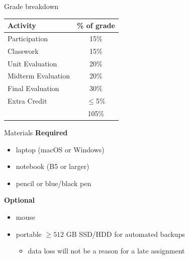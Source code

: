 \documentclass[aspectratio=169]{beamer}
\begin{document}
\begin{frame}{Grade breakdown}
    \begin{table}
    \centering
        \begin{tabular}{lc}
            \toprule
            \textbf{Activity}  & \textbf{\% of grade} \\
            \midrule
            Participation      & 15\% \\
            Classwork          & 15\% \\
            Unit Evaluation    & 20\% \\
            Midterm Evaluation & 20\% \\
            Final Evaluation   & 30\% \\
            Extra Credit       & \(\leq\)5\% \\
            \bottomrule
                               & 105\% \\
        \end{tabular}
    \end{table}   
\end{frame}


\begin{frame}{Materials}
    \textbf{Required}
    \begin{itemize}[label=--]
        \item laptop (macOS or Windows)
        \item notebook (B5 or larger)
        \item pencil or blue/black pen
    \end{itemize}
    \vspace{15pt}
    \textbf{Optional}
    \begin{itemize}[label=--]
        \item mouse
        \item portable \(\geq 512\) GB SSD/HDD for automated backups
            \begin{itemize}[label=\(\blacktriangleright\),itemsep=5pt]
                \item data loss will not be a reason for a late assignment
            \end{itemize}
    \end{itemize}
\end{frame}
\end{document}
